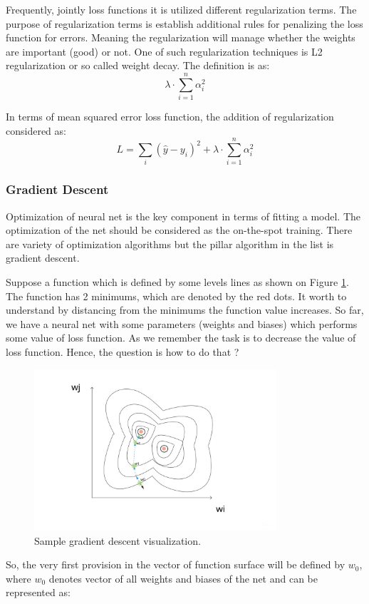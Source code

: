 Frequently, jointly loss functions it is utilized different regularization terms. The purpose of regularization terms is establish additional rules for penalizing the loss function for errors. Meaning the regularization will manage whether the weights are important (good) or not. One of such regularization techniques is L2 regularization or so called weight decay. The definition is as:
\[ \lambda \cdot \sum_{i=1}^{n} \alpha_i^2 \]

In terms of mean squared error loss function, the addition of regularization considered as:
\[ L = \sum_{i}(\hat{y}-y_i)^2 + \lambda \cdot \sum_{i=1}^{n} \alpha_i^2\]

\subsubsection{Gradient Descent}
Optimization of neural net is the key component in terms of fitting a model. The optimization of the net should be considered as the on-the-spot training. There are variety of optimization algorithms but the pillar algorithm in the list is gradient descent.

Suppose a function which is defined by some levels lines as shown on Figure \ref{fig:gradient}. The function has 2 minimums, which are denoted by the red dots.  It worth to understand by distancing from the minimums the function value increases. 
So far, we have a neural net with some parameters (weights and biases) which performs some value of loss function. As we remember the task is to decrease the value of loss function. Hence, the question is how to do that ? 

\begin{figure}[h]
    \centering \includegraphics[width=9cm]{images/gradient_descent.jpg}
    \caption {Sample gradient descent visualization.}
    \label{fig:gradient}
\end{figure}

So, the very first provision in the vector of function surface will be defined by $w_0$, where $w_0$ denotes vector of all weights and biases of the net and can be represented as: 

